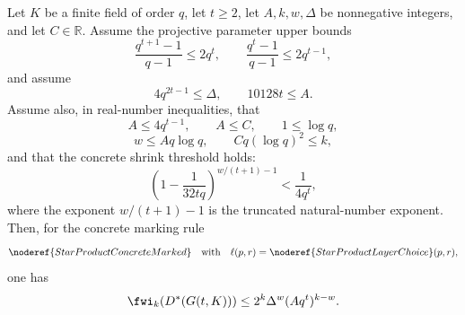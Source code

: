 \begin{helper}
Let \(K\) be a finite field of order \(q\), let \(t\ge2\), let
\(A,k,w,\Delta\) be nonnegative integers, and let \(C\in\mathbb R\).  Assume
the projective parameter upper bounds
\[
  \frac{q^{t+1}-1}{q-1}\le 2q^t,\qquad
  \frac{q^t-1}{q-1}\le 2q^{t-1},
\]
and assume
\[
  4q^{2t-1}\le\Delta,\qquad 10128t\le A.
\]
Assume also, in real-number inequalities, that
\[
  A\le 4q^{t-1},\qquad A\le C,\qquad 1\le\log q,
\]
\[
  w\le Aq\log q,\qquad Cq(\log q)^2\le k,
\]
and that the concrete shrink threshold holds:
\[
  \left(1-\frac{1}{32tq}\right)^{w/(t+1)-1}
  < \frac{1}{4q^t},
\]
where the exponent \(w/(t+1)-1\) is the truncated natural-number exponent.
Then, for the concrete marking rule
\[
  \noderef{StarProductConcreteMarked}
  \quad\text{with}\quad
  \ell(p,r)=\noderef{StarProductLayerChoice}(p,r),
\]
one has
\[
  \fwi_k(D^*(G(t,K)))
  \le 2^k\Delta^w(Aq^t)^{k-w}.
\]
\end{helper}
